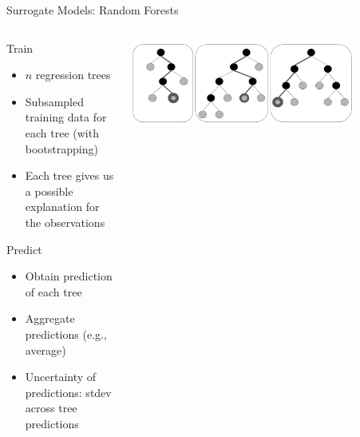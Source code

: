 \begin{frame}[c]{Surrogate Models: Random Forests}

\begin{columns}[T] %
\begin{column}{.48\textwidth}


\begin{block}{Train}
\begin{itemize}
	\item $n$ regression trees
	\item Subsampled training data for each tree (with bootstrapping)
	\item Each tree gives us a possible explanation for the observations
\end{itemize}
\end{block}

\pause
    \begin{block}{Predict}
    \begin{itemize}
    	\item Obtain prediction of each tree
    	\item Aggregate predictions (e.g., average)
    	\item Uncertainty of predictions: stdev across tree predictions
    \end{itemize}
    \end{block}

\end{column}%


\hfill%

\begin{column}{.48\textwidth}
    \centering
    \includegraphics[width=0.8\textwidth]{images/surrogate_models/random_forest_pic}
\end{column}
\end{columns}

\end{frame}

